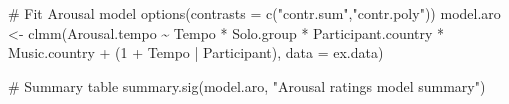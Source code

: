 \documentclass[
  bookmarksnumbered]{article}
\newenvironment{Shaded}{\begin{snugshade}}{\end{snugshade}}
\newcommand{\AttributeTok}[1]{\textcolor[rgb]{0.80,0.80,0.80}{#1}}
\newcommand{\CommentTok}[1]{\textcolor[rgb]{0.50,0.62,0.50}{#1}}
\newcommand{\DecValTok}[1]{\textcolor[rgb]{0.86,0.86,0.80}{#1}}
\newcommand{\FunctionTok}[1]{\textcolor[rgb]{0.94,0.94,0.56}{#1}}
\newcommand{\NormalTok}[1]{\textcolor[rgb]{0.80,0.80,0.80}{#1}}
\newcommand{\OtherTok}[1]{\textcolor[rgb]{0.94,0.94,0.56}{#1}}
\newcommand{\SpecialCharTok}[1]{\textcolor[rgb]{0.86,0.64,0.64}{#1}}
\newcommand{\StringTok}[1]{\textcolor[rgb]{0.80,0.58,0.58}{#1}}
\begin{document}
\begin{Shaded}
\begin{Highlighting}[]
\CommentTok{\# Fit Arousal model}
\FunctionTok{options}\NormalTok{(}\AttributeTok{contrasts =} \FunctionTok{c}\NormalTok{(}\StringTok{"contr.sum"}\NormalTok{,}\StringTok{"contr.poly"}\NormalTok{))}
\NormalTok{model.aro }\OtherTok{\textless{}{-}} \FunctionTok{clmm}\NormalTok{(Arousal.tempo }\SpecialCharTok{\textasciitilde{}}\NormalTok{ Tempo }\SpecialCharTok{*}\NormalTok{ Solo.group }\SpecialCharTok{*}\NormalTok{ Participant.country }\SpecialCharTok{*}\NormalTok{ Music.country }\SpecialCharTok{+} 
\NormalTok{                    (}\DecValTok{1} \SpecialCharTok{+}\NormalTok{ Tempo }\SpecialCharTok{|}\NormalTok{ Participant),}
                  \AttributeTok{data =}\NormalTok{ ex.data)}

\CommentTok{\# Summary table}
\FunctionTok{summary.sig}\NormalTok{(model.aro, }\StringTok{"Arousal ratings model summary"}\NormalTok{)}
\end{Highlighting}
\end{Shaded}
\end{document}
